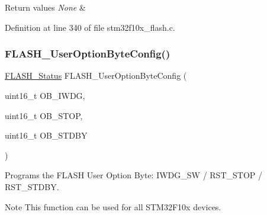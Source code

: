 \begin{DoxyRetVals}{Return values}
{\em None} & \\
\hline
\end{DoxyRetVals}


Definition at line 340 of file stm32f10x\+\_\+flash.\+c.

\mbox{\label{group___f_l_a_s_h___private___functions_gaae1c493bb06c930ceb84dedfdb7325f6}} 
\subsubsection{\texorpdfstring{F\+L\+A\+S\+H\+\_\+\+User\+Option\+Byte\+Config()}{FLASH\_UserOptionByteConfig()}}
{\footnotesize\ttfamily \hyperlink{group___f_l_a_s_h___exported___types_gadc63a6f3404ff1f71229a66915e9cdc0}{F\+L\+A\+S\+H\+\_\+\+Status} F\+L\+A\+S\+H\+\_\+\+User\+Option\+Byte\+Config (\begin{DoxyParamCaption}\item[{uint16\+\_\+t}]{O\+B\+\_\+\+I\+W\+DG,  }\item[{uint16\+\_\+t}]{O\+B\+\_\+\+S\+T\+OP,  }\item[{uint16\+\_\+t}]{O\+B\+\_\+\+S\+T\+D\+BY }\end{DoxyParamCaption})}



Programs the F\+L\+A\+SH User Option Byte\+: I\+W\+D\+G\+\_\+\+SW / R\+S\+T\+\_\+\+S\+T\+OP / R\+S\+T\+\_\+\+S\+T\+D\+BY. 

\begin{DoxyNote}{Note}
This function can be used for all S\+T\+M32\+F10x devices. 
\end{DoxyNote}

